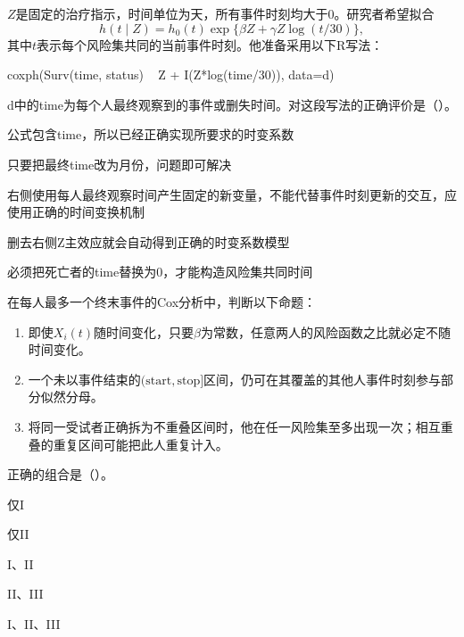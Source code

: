 \par\noindent\begin{minipage}{\linewidth}
$Z$是固定的治疗指示，时间单位为天，所有事件时刻均大于0。研究者希望拟合
\[
h(t\mid Z)=h_0(t)\exp\{\beta Z+\gamma Z\log(t/30)\},
\]
其中$t$表示每个风险集共同的当前事件时刻。他准备采用以下R写法：

\begin{rcode}
coxph(Surv(time, status) ~ Z + I(Z*log(time/30)),
      data=d)
\end{rcode}
d中的time为每个人最终观察到的事件或删失时间。对这段写法的正确评价是（\quad）。
\begin{choices}
\item 公式包含time，所以已经正确实现所要求的时变系数
\item 只要把最终time改为月份，问题即可解决
\item 右侧使用每人最终观察时间产生固定的新变量，不能代替事件时刻更新的交互，应使用正确的时间变换机制
\item 删去右侧Z主效应就会自动得到正确的时变系数模型
\item 必须把死亡者的time替换为0，才能构造风险集共同时间
\end{choices}
\end{minipage}\par\medskip

\par\noindent\begin{minipage}{\linewidth}
在每人最多一个终末事件的Cox分析中，判断以下命题：
\begin{enumerate}
\item[I.] 即使$X_i(t)$随时间变化，只要$\beta$为常数，任意两人的风险函数之比就必定不随时间变化。
\item[II.] 一个未以事件结束的$(\mathrm{start},\mathrm{stop}]$区间，仍可在其覆盖的其他人事件时刻参与部分似然分母。
\item[III.] 将同一受试者正确拆为不重叠区间时，他在任一风险集至多出现一次；相互重叠的重复区间可能把此人重复计入。
\end{enumerate}
正确的组合是（\quad）。
\begin{choices}
\item 仅I
\item 仅II
\item I、II
\item II、III
\item I、II、III
\end{choices}
\end{minipage}\par\medskip

